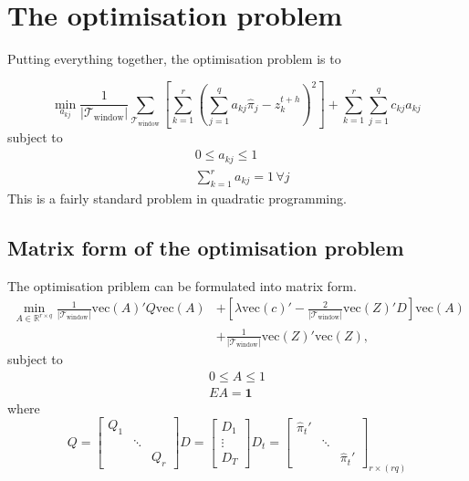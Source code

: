 \documentclass{article}
\begin{document}
    \section{The optimisation problem}
    
    Putting everything together, the optimisation problem is to 
    
    \[
    \underset{a_{kj}}{\min} \frac{1}{|\mathcal{T}_{\textrm{window}}|}\sum\limits_{\mathcal{T}_{\textrm{window}}}\left[\sum\limits_{k=1}^r\left(\sum\limits_{j=1}^q a_{kj}\hat{{\pi}}_j-z^{t+h}_k\right)^2\right] + \sum\limits_{k=1}^r\sum\limits_{j=1}^q c_{kj}a_{kj}\,
    \]
    subject to
    \begin{align*}
    &0\leq a_{kj}\leq 1\\
    &\sum\limits_{k=1}^r a_{kj} = 1 \,\forall j
    \end{align*}
    This is a fairly standard problem in quadratic programming.

    \subsection{Matrix form of the optimisation problem}

    The optimisation priblem can be formulated into matrix form.
    \begin{align*}
      \min\limits_{A \in \mathbb{R}^{r\times q}} \frac{1}{|\mathcal{T}_{\textrm{window}}|}\text{vec}(A)' Q \text{vec}(A) &+ \left[\lambda \text{vec}(c)' - \frac{2}{|\mathcal{T}_{\textrm{window}}|}\text{vec}(Z)'D\right]\text{vec}(A) \\&+ \frac{1}{|\mathcal{T}_{\textrm{window}}|} \text{vec}(Z)'\text{vec}(Z),
    \end{align*}
    subject to \begin{align*}
      0 \leq A \leq 1\\
      E A = \mathbf{1}
    \end{align*}
    where
    \[
    Q = \left[\begin{matrix}
      Q_1  & \\
       &\ddots \\
       &  & Q_r

    \end{matrix}  \right]
    D = \left[\begin{matrix}
      D_1 \\ \vdots \\ D_T
    \end{matrix}\right] 
    D_t = \left[\begin{matrix}
      \hat\pi_{t}' & \\
      & \ddots & \\
      & & \hat\pi_{t}'
    \end{matrix}\right]_{r\times (rq)}
    \]
\end{document}
